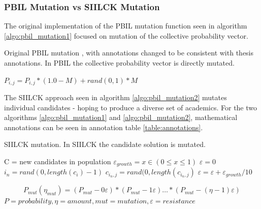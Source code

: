\documentclass[a4paper,english]{report}
\begin{document}
		\subsubsection{PBIL Mutation vs SIILCK Mutation}
		The original implementation of the PBIL mutation function seen in algorithm \ref{algo:pbil_mutation1} focused on mutation of the collective probability vector. 
		\begin{algorithm}
			\caption{Original PBIL mutation \cite{pbil}, with annotations changed to be consistent with thesis annotations. In PBIL the collective probability vector is directly mutated.}\label{algo:pbil_mutation1}
			\scriptsize
			\begin{algorithmic}
				
						\STATE $P_{i,j} = P_{i,j} * (1.0 - M) + rand(0,1) * M$
					\ENDIF
				\ENDFOR
			\end{algorithmic}
		\end{algorithm}
	The SIILCK approach seen in algorithm \ref{algo:pbil_mutation2} mutates individual candidates - hoping to produce a diverse set of academics. For the two algorithms \ref{algo:pbil_mutation1} and \ref{algo:pbil_mutation2}, mathematical annotations can be seen in annotation table \ref{table:annotations}.
		\begin{algorithm}
		\caption{SIILCK mutation. In SIILCK the candidate solution is mutated.}\label{algo:pbil_mutation2}
		\scriptsize
			\begin{algorithmic}
			\REQUIRE C = new candidates in population
			\ENSURE $\varepsilon_{growth} = x \in (0 \leq x \leq 1) $
			\FOR{c in C}
			\IF{$rand(0,1) < P_{mut}$}
				\STATE $\varepsilon = 0$
				\WHILE{$ rand(0,1) < P_{mut} - \varepsilon $}
					\STATE $i_{n} = rand(0, length(c_{i})-1)$
					\STATE $c_{i_{n},j}  = rand(0,length(c_{i_{n},j})$
					\STATE $\varepsilon = \varepsilon + \varepsilon_{growth} / 10$
				\ENDWHILE
			\ENDIF
			\ENDFOR
			
			\end{algorithmic}
		\end{algorithm}
	
			\begin{equation}\label{math:mutation_chance}
			P_{mut}(\eta_{mut}) = (P_{mut}-0 \varepsilon) * (P_{mut}-1 \varepsilon) \ldots * (P_{mut}-(\eta-1) \varepsilon)
			\end{equation}
			{\centering
				\begin{math}
				P = probability, \eta = amount, mut = mutation, \varepsilon = resistance
				\end{math}\\
			}
\end{document}
